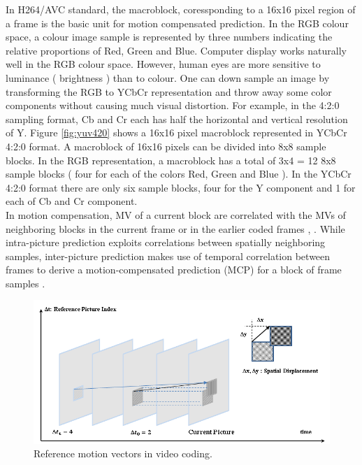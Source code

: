 	In H264/AVC standard, the macroblock, coressponding to a 16x16 pixel region of a frame is the basic unit for motion compensated prediction. In the RGB colour space, a colour image sample is represented by three numbers indicating the relative proportions of Red, Green and Blue. Computer display works naturally well in the RGB colour space. However, human eyes are more sensitive to luminance ( brightness ) than to colour. One can down sample an image by transforming the RGB to YCbCr representation and throw away some color components without causing much visual distortion. For example, in the 4:2:0 sampling format, Cb and Cr each has half the horizontal and vertical resolution of Y. Figure \ref{fig:yuv420} shows a 16x16 pixel macroblock represented in YCbCr 4:2:0 format. A macroblock of 16x16 pixels can be divided into 8x8 sample blocks. In the RGB representation, a macroblock has a total of 3x4 = 12 8x8 sample blocks ( four for each of the colors Red, Green and Blue ). In the YCbCr 4:2:0 format there are only six sample blocks, four for the Y component and 1 for each of Cb and Cr component.\\
  In  motion compensation, MV of a current block are correlated with the MVs of neighboring blocks in the current frame or in the earlier coded frames \cite{laroche2008rd}, \cite{jiang2019spatial}. While intra-picture prediction exploits correlations between spatially neighboring samples, inter-picture prediction makes use of temporal correlation between frames to derive a motion-compensated prediction (MCP) for a block of frame samples \cite{bross2014inter}.
\begin{figure}
\centering
 \includegraphics[width=0.8\linewidth]{Figures/mv.png}
 \caption{ Reference motion vectors in video coding.}
 \label{fig:mv}
\end{figure}
